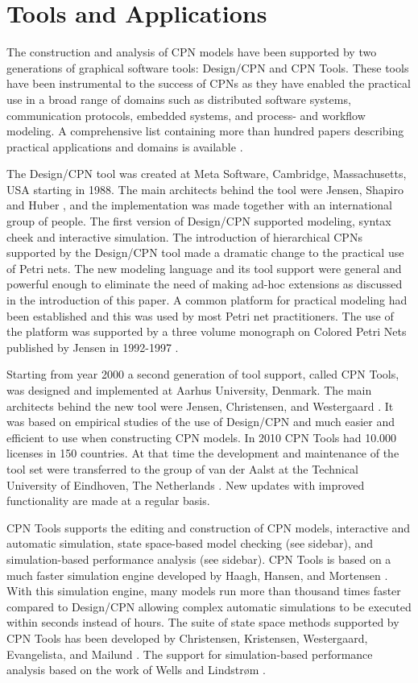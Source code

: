 \section{Tools and Applications}

The construction and analysis of CPN models have been supported by two
generations of graphical software tools: Design/CPN and CPN
Tools. These tools have been instrumental to the success of CPNs as
they have enabled the practical use in a broad range of domains such
as distributed software systems, communication protocols, embedded
systems, and process- and workflow modeling. A comprehensive list
containing more than hundred papers describing practical applications
and domains is available \cite{cpnuse}.

The Design/CPN tool \cite{tacas97} was created at Meta Software,
Cambridge, Massachusetts, USA starting in 1988. The main architects
behind the tool were Jensen, Shapiro and Huber
\cite{jensen:cpnmanual}, and the implementation was made together with
an international group of people. The first version of Design/CPN
supported modeling, syntax cheek and interactive simulation. The
introduction of hierarchical CPNs supported by the Design/CPN tool
made a dramatic change to the practical use of Petri nets. The new
modeling language and its tool support were general and powerful
enough to eliminate the need of making ad-hoc extensions as discussed
in the introduction of this paper. A common platform for practical
modeling had been established and this was used by most Petri net
practitioners. The use of the platform was supported by a three volume
monograph on Colored Petri Nets published by Jensen in 1992-1997
\cite{jensen:cpnvols}.  

Starting from year 2000 a second generation of tool support, called
CPN Tools, was designed and implemented at Aarhus University,
Denmark. The main architects behind the new tool were Jensen,
Christensen, and Westergaard \cite{cpn2003}.  It was based on
empirical studies of the use of Design/CPN and much easier and
efficient to use when constructing CPN models. In 2010 CPN Tools had
10.000 licenses in 150 countries. At that time the development and
maintenance of the tool set were transferred to the group of van der
Aalst at the Technical University of Eindhoven, The Netherlands
\cite{cpntoolsweb}. New updates with improved functionality are made
at a regular basis.

CPN Tools supports the editing and construction of CPN models,
interactive and automatic simulation, state space-based model checking
(see sidebar), and simulation-based performance analysis (see
sidebar). CPN Tools is based on a much faster simulation engine
developed by Haagh, Hansen, and Mortensen \cite{mortensen:01}. With this
simulation engine, many models run more than thousand times faster
compared to Design/CPN allowing complex automatic simulations to be
executed within seconds instead of hours. The suite of state space
methods supported by CPN Tools has been developed by Christensen,
Kristensen, Westergaard, Evangelista, and Mailund
\cite{asap,sweep}. The support for simulation-based performance
analysis based on the work of Wells and Lindstr\o{}m
\cite{performance1}.

